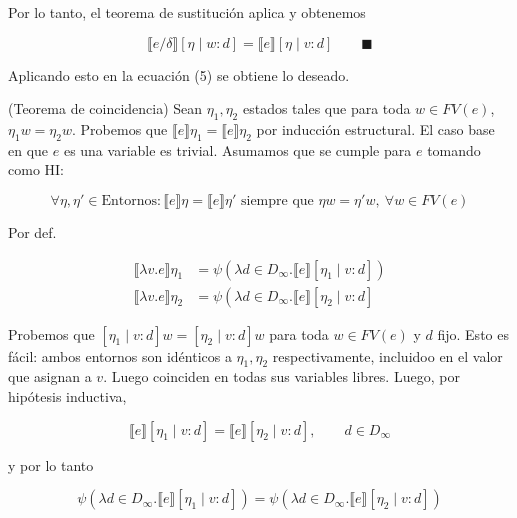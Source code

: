 \documentclass[article, 12pt]{article}
\begin{document}
Por lo tanto, el teorema de sustitución aplica y obtenemos 

\begin{equation*}
  \llbracket e / \delta \rrbracket[\eta \mid w : d] = \llbracket e
  \rrbracket[\eta \mid v : d] \qquad \blacksquare
\end{equation*}

Aplicando esto en la ecuación (5) se obtiene lo deseado.

(Teorema de coincidencia) Sean $\eta_1, \eta_2$ estados tales que para toda $w
\in FV(e)$, $\eta_1 w = \eta_2 w$. Probemos que $\llbracket e \rrbracket\eta_1
= \llbracket e \rrbracket\eta_2$ por inducción estructural. El caso base en que
$e$ es una variable es trivial. Asumamos que se cumple para $e$ tomando como HI:

\begin{equation*}
  \forall \eta, \eta' \in \text{Entornos} : \llbracket e \rrbracket\eta =
  \llbracket e \rrbracket\eta' \text{ siempre que } \eta w = \eta' w, ~ \forall
  w \in FV(e)
\end{equation*}

Por def.

\begin{align*}
  \llbracket \lambda v. e \rrbracket \eta_1
  &=\psi\left( \lambda d \in D_\infty.\llbracket e \rrbracket[\eta_1 \mid v : d]  \right)  \\ 
  \llbracket \lambda v. e \rrbracket \eta_2
  &=\psi\left( \lambda d \in D_\infty.\llbracket e \rrbracket[\eta_2 \mid v : d]
\end{align*}

Probemos que $[\eta_1 \mid v : d] w = [\eta_2 \mid v : d] w$ para toda $w \in
FV(e)$ y $d$ fijo. Esto es fácil: ambos entornos son idénticos a $\eta_1, \eta_2$
respectivamente, incluidoo en el valor que asignan a $v$. Luego coinciden en
todas sus variables libres. Luego, por hipótesis inductiva, 

\begin{equation*}
  \llbracket e \rrbracket[\eta_1 \mid v : d] = \llbracket e \rrbracket[\eta_2
  \mid v : d], \qquad d \in D_\infty
\end{equation*}

y por lo tanto 

\begin{equation*}
  \psi\left( \lambda d \in D_\infty.\llbracket e \rrbracket[\eta_1 \mid v : d]
  \right)  =
  \psi\left( \lambda d \in D_\infty.\llbracket e \rrbracket[\eta_2 \mid v : d]  \right) 
\end{equation*}
\end{document}
